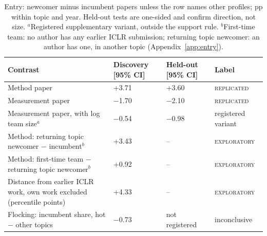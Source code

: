 \documentclass[11pt]{article}
\newcommand{\lab}[1]{\textsc{#1}}
\begin{document}
\begin{table}[t]
\centering
\scriptsize
\setlength{\tabcolsep}{2pt}
\renewcommand{\arraystretch}{1.05}
\begin{tabularx}{\columnwidth}{@{}Y L{1.64cm} L{1.64cm} L{1.56cm}@{}}
\toprule
Contrast & Discovery [95\% CI] & Held-out [95\% CI] & Label \\
\midrule
Method paper & +3.71\newline[+2.61, +4.80] & +3.60\newline[+1.48, +5.71] & \lab{replicated} \\
Measurement paper & $-$1.70\newline[$-$2.46, $-$0.93] & $-$2.10\newline[$-$3.35, $-$0.85] & \lab{replicated} \\
Measurement paper, with log team size$^a$ & $-$0.54\newline[$-$1.11, +0.04] & $-$0.98 & registered variant \\
\addlinespace
Method: returning topic newcomer $-$ incumbent$^b$ & +3.43\newline[+2.31, +4.55] & -- & \lab{exploratory} \\
Method: first-time team $-$ returning topic newcomer$^b$ & +0.92\newline[$-$0.44, +2.29] & -- & \lab{exploratory} \\
Distance from earlier ICLR work, own work excluded (percentile points) & +4.33\newline[+3.44, +5.22] & -- &
\lab{exploratory} \\
\addlinespace
Flocking: incumbent share, hot $-$ other topics & $-$0.73\newline[$-$2.68, +1.22] & not registered & inconclusive \\
\bottomrule
\end{tabularx}
\caption{Entry: newcomer minus incumbent papers unless the row names other profiles; pp within topic and year.
Held-out tests are one-sided and confirm direction, not size. $^a$Registered supplementary variant, outside the
support rule. $^b$First-time team: no author has any earlier ICLR submission; returning topic newcomer: an author
has one, in another topic (Appendix~\ref{app:entry}).}
\label{tab:entry}
\end{table}
\end{document}
